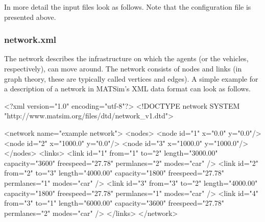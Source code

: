 In more detail the input files look as follows. Note that the configuration file is presented above.

\subsubsection{network.xml}
The network describes the infrastructure on which the agents (or the vehicles, respectively), can move around. The network consists of nodes and links (in graph theory, these are typically called vertices and edges). A simple example for a description of a network in MATSim's XML data format can look as follows.

\begin{xml}
<?xml version="1.0" encoding="utf-8"?> 
<!DOCTYPE network SYSTEM "http://www.matsim.org/files/dtd/network_v1.dtd"> 
 
<network name="example network"> 
   <nodes> 
      <node id="1" x="0.0" y="0.0"/> 
      <node id="2" x="1000.0" y="0.0"/> 
      <node id="3" x="1000.0" y="1000.0"/> 
   </nodes> 
   <links> 
      <link id="1" from="1" to="2" length="3000.00" capacity="3600" 
                                 freespeed="27.78" permlanes="2" modes="car" /> 
      <link id="2" from="2" to="3" length="4000.00" capacity="1800" 
                                 freespeed="27.78" permlanes="1" modes="car" /> 
      <link id="3" from="3" to="2" length="4000.00" capacity="1800" 
                                 freespeed="27.78" permlanes="1" modes="car" /> 
      <link id="4" from="3" to="1" length="6000.00" capacity="3600" 
                                 freespeed="27.78" permlanes="2" modes="car" /> 
   </links> 
</network>
\end{xml}

